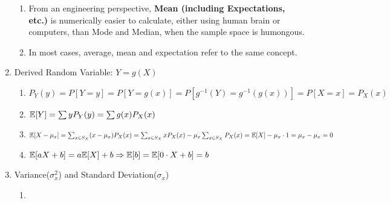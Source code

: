 \begin{enumerate}
{\begin{enumerate}
{\begin{enumerate}
{                        \begin{enumerate}
                            \item Bernoulli(p): \[\E{X}=0\cdot P_X(0)+1\cdot P_X(1)=0(1-p)+1(p)=p\]
                            \item Binomial(n, p): \[\E{X}=np\]
                            \item Poisson($\alpha$): \[\E{X}=\alpha\]
                            \item Geometric(p): \[\E{X}=\sum_{x=1}^{\infty}xP_X(x)=\sum_{x=1}^{\infty}xp(1-p)^{x-1}=\dfrac{p}{1-p}\sum_{x=1}^{\infty}x(1-p)^x=\dfrac{p}{1-p}\dfrac{1-p}{[1-(1-p)]^2}=\dfrac{p}{p^2}=\dfrac{1}{p}\]
                            \item Pascal(k, p): \[\E{X}=k/p\]
                            \item Discrete Uniform(k, l): \[\E{X}=(k+l)/2\]
                        \end{enumerate}
                    }
                \end{enumerate}
            }
            \item From an engineering perspective, \textbf{Mean (including Expectations, etc.)} is numerically easier to calculate, either using human brain or computers, than Mode and Median, when the sample space is humongous. 
            \item In most cases, average, mean and expectation refer to the same concept. 
        \end{enumerate}
    }
    \item Derived Random Variable: $Y = g(X)${
        \begin{enumerate}
            \item $P_Y(y) = P[Y=y] = P[Y=g(x)] = P[g^{-1}(Y)=g^{-1}(g(x))] = P[X=x] = P_X(x)$
            \item $\E{Y} = \sum yP_Y(y) = \sum g(x)P_X(x)$
            \item $\E{X-\mu_x}=\sum_{x\in S_X}(x-\mu_x)P_X(x)=\sum_{x\in S_X}xP_X(x)-\mu_x\sum_{x\in S_X}P_X(x)=\E{X}-\mu_x\cdot 1=\mu_x-\mu_x=0$
            \item $\E{aX+b}=a\E{X}+b \Rightarrow \E{b}=\E{0\cdot X+b}=b$
        \end{enumerate}
    }
    \item Variance($\sigma_x^2$) and Standard Deviation($\sigma_x$){
        \begin{enumerate}
            \item {
                \begin{align*}

\end{align*}}
\end{enumerate}}
\end{enumerate}
